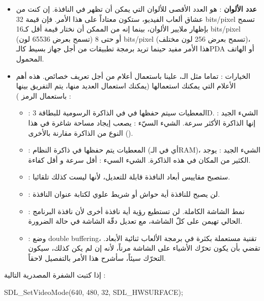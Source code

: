 \begin{itemize}
	\item \textbf{عدد الألوان} : 
	هو العدد الأقصى للألوان التي يمكن أن تظهر في النافذة. إن كنت من عشاق ألعاب الفيديو، ستكون معتاداً على هذا الأمر. فإن قيمة 
	\textenglish{32 bits/pixel}
	تسمح بإظهار ملايير الألوان، بينما إنه من الممكن أن نختار قيمة أقل كـ\textenglish{16 bits/pixel}
	(تسمح بعرض 65536 لون) أو حتى 
	\textenglish{8 bits/pixel}
	(تسمح بعرض 256 لون مختلف)، هذا الأمر مفيد حينما تريد برمجة تطبيقات من أجل جهاز بسيط كالـ\textenglish{PDA}
	أو الهاتف المحمول.
	\item الخيارات : تماما مثل الـ،
	علينا باستعمال أعلام من أجل تعريف خصائص. هذه أهم الأعلام التي يمكنك استعمالها (يمكنك استعمال العديد منها، يتم التفريق بينها باستعمال الرمز
	\InlineCode{|}) :
	\begin{itemize}
		\item {} :
المعطيات سيتم حفظها في في الذاكرة الرسومية للبطاقة
\textenglish{3D}.
الشيء الجيد : إنها الذاكرة الأكثر سرعة. الشيء السيّء : يصعب إيجاد مساحة شاغرة في هذا النوع من الذاكرة مقارنة بالأخرى 
().
		\item {} :
المعطيات يتم حفظها في ذاكرة النظام (أي في الـ\textenglish{RAM})،
الشيء الجيد : يوجد الكثير من المكان في هذه الذاكرة. الشيء السيء : أقل سرعة و أقل كفاءة.
		\item {} :
		ستصبح مقاييس أبعاد النافذة قابلة للتعديل، لأنها ليست كذلك تلقائيا.
		\item {} :
		لن يصبح للنافذة أية حواش أو شريط علوي لكتابة عنوان النافذة.
		\item {} :
		نمط الشاشة الكاملة. لن تستطيع رؤية أية نافذة أخرى لأن نافذة البرنامج الحالي تهيمن على كلّ الشاشة، مع تعديل دقّة الشاشة في حالة الضرورة.
		\item {} : وضع 
		\textenglish{double buffering}،
		تقنية مستعملة بكثرة في برمجة الألعاب ثنائية الأبعاد. تقضي بأن يكون تحرّك الأشياء على الشاشة مرناً، لأنه إن لم يكن كذلك، سيكون التحرّك سيئاً، سأشرح هذا الأمر بالتفصيل لاحقاً.
	\end{itemize}
\end{itemize}

إذا كتبت الشفرة المصدرية التالية :

\begin{Csource}
SDL_SetVideoMode(640, 480, 32, SDL_HWSURFACE);
\end{Csource}

